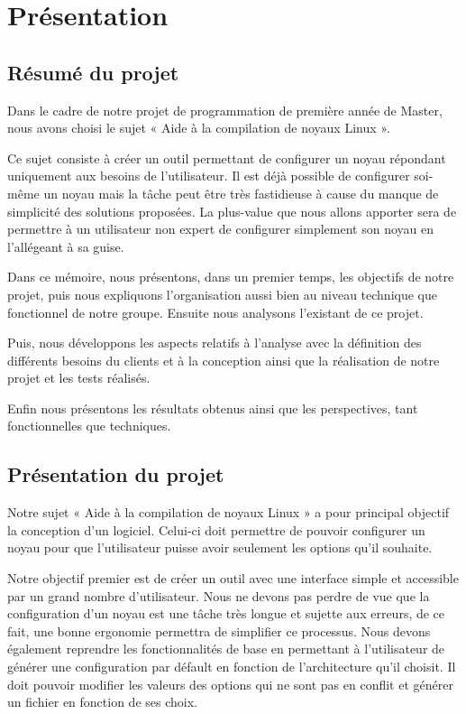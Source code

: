 \documentclass[16pts]{report}
\begin{document}

\nocite{*}

\chapter{Présentation}
\label{cha:Présentation}

\section{Résumé du projet}
\label{sec:Résumé du projet}

Dans le cadre de notre projet de programmation de première année de Master, nous avons choisi le sujet « Aide à la compilation de noyaux Linux ».

Ce sujet consiste à créer un outil permettant de configurer un noyau répondant uniquement aux besoins de l'utilisateur. Il est déjà possible de configurer soi-même un noyau mais la tâche peut être très fastidieuse à cause du manque de simplicité des solutions proposées. La plus-value que nous allons apporter sera de permettre à un utilisateur non expert de configurer simplement son noyau en l'allégeant à sa guise.

Dans ce mémoire, nous présentons, dans un premier temps, les objectifs de notre projet, puis nous expliquons l’organisation aussi bien au niveau technique que fonctionnel de notre groupe. Ensuite nous analysons l'existant de ce projet.

Puis, nous développons les aspects relatifs à l’analyse avec la définition des différents besoins du clients et à la conception ainsi que la réalisation de notre projet et les tests réalisés.

Enfin nous présentons les résultats obtenus ainsi que les perspectives, tant fonctionnelles que techniques.


\section{Présentation du projet}
\label{sec:Présentation du projet}

Notre sujet « Aide à la compilation de noyaux Linux » a pour principal objectif la conception d'un logiciel. Celui-ci doit permettre de pouvoir configurer un noyau pour que l'utilisateur puisse avoir seulement les options qu'il souhaite. 

Notre objectif premier est de créer un outil avec une interface simple et accessible par un grand nombre d'utilisateur. Nous ne devons pas perdre de vue que la configuration d'un noyau est une tâche très longue et sujette aux erreurs, de ce fait, une bonne ergonomie permettra de simplifier ce processus. Nous devons également reprendre les fonctionnalités de base en permettant à l'utilisateur de générer une configuration par défault en fonction de l'architecture qu'il choisit. Il doit pouvoir modifier les valeurs des options qui ne sont pas en conflit et générer un fichier en fonction de ses choix.
\end{document}
